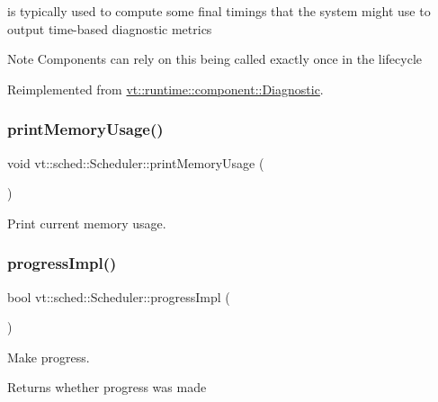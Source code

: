 is typically used to compute some final timings that the system might use to output time-\/based diagnostic metrics

\begin{DoxyNote}{Note}
Components can rely on this being called exactly once in the lifecycle 
\end{DoxyNote}


Reimplemented from \hyperlink{structvt_1_1runtime_1_1component_1_1_diagnostic_a4e64b5a12ffc1874065aa8b09e6309a9}{vt\+::runtime\+::component\+::\+Diagnostic}.

\mbox{\label{structvt_1_1sched_1_1_scheduler_a48a6fdb0c7384df09b467c0e68ca8e6f}} 
\subsubsection{\texorpdfstring{print\+Memory\+Usage()}{printMemoryUsage()}}
{\footnotesize\ttfamily void vt\+::sched\+::\+Scheduler\+::print\+Memory\+Usage (\begin{DoxyParamCaption}{ }\end{DoxyParamCaption})}



Print current memory usage. 

\mbox{\label{structvt_1_1sched_1_1_scheduler_a79ffccdc48af8073122f4de2d17e9d55}} 
\subsubsection{\texorpdfstring{progress\+Impl()}{progressImpl()}}
{\footnotesize\ttfamily bool vt\+::sched\+::\+Scheduler\+::progress\+Impl (\begin{DoxyParamCaption}{ }\end{DoxyParamCaption})\hspace{0.3cm}{\ttfamily [private]}}



Make progress. 

\begin{DoxyReturn}{Returns}
whether progress was made 
\end{DoxyReturn}
\mbox{\label{structvt_1_1sched_1_1_scheduler_adf3b895d57723f142ff413b3698fdf98}} 
